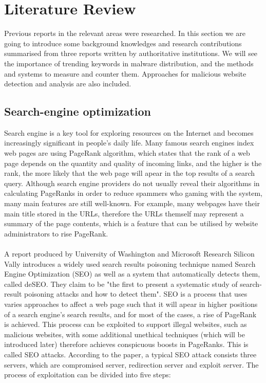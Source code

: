 \section{Literature Review}

Previous reports in the relevant areas were researched. In this section we are
going to introduce some background knowledges and research contributions
summarised from three reports written by authoritative institutions. We will
see the importance of trending keywords in malware distribution, and the
methods and systems to measure and counter them. Approaches for malicious
website detection and analysis are also included. 

\subsection{Search-engine optimization} 

Search engine is a key tool for
exploring resources on the Internet and becomes increasingly significant in
people's daily life. Many famous search engines index web pages are using PageRank
algorithm, which states that the rank of a web page depends on the quantity and
quality of incoming links, and the higher is the rank, the more likely that the
web page will apear in the top results of a search query. Although search
engine providers do not usually reveal their algorithms in calculating
PageRanks in order to reduce spammers who gaming with the system, many main
features are still well-known. For example, many webpages have their main title
stored in the URLs, therefore the URLs themself may represent a summary of the
page contents, which is a feature that can be utilised by website administrators 
to rise PageRank.
\paragraph{}
A report produced by University of Washington and Microsoft
Research Silicon Vally introduces a widely used search results poisoning
technique named Search Engine Optimization (SEO) as well as a system that
automatically detects them, called deSEO.\cite{deseo} They claim to be "the
first to present a systematic study of search-result poisoning attacks and how
to detect them". SEO is a process that uses varies approaches to affect a web
page such that it will apear in higher positions of a search engine's search
results, and for most of the cases, a rise of PageRank is achieved. This
process can be exploited to support illegal websites, such as malicious
websites, with some additional unethical techniques (which will be introduced
later) therefore achieves conspicuous boosts in PageRanks. This is called SEO
attacks. According to the paper, a typical SEO attack consists three servers,
which are compromised server, redirection server and exploit server. The
process of exploitation can be divided into five steps: 
